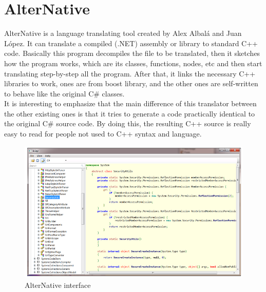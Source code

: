 \section{AlterNative}\label{S:Proposal-AlterNative}
AlterNative is a language translating tool created by Alex Albal\'{a} and Juan L\'{o}pez. It can translate a compiled (.NET) assembly or library to standard C++ code. Basically this program decompiles the file to be translated, then it sketches how the program works, which are its classes, functions, nodes, etc and then start translating step-by-step all the program. After that, it links the necessary C++ libraries to work, ones are from boost library, and the other ones are self-written to behave like the original C\# classes.
\\
It is interesting to emphasize that the main difference of this translator between the other existing ones is that it tries to generate a code practically identical to the original C\# source code. By doing this, the resulting C++ source is really easy to read for people not used to C++ syntax and language.
\begin{figure}[H]\begin{center}
 \centering
  \captionsetup{justification=centering}
 \includegraphics[scale=0.65]{pictures/proposal/alternativeUI}
  \caption{AlterNative interface \label{fig:Proposal-AN}}
\end{center}\end{figure}


